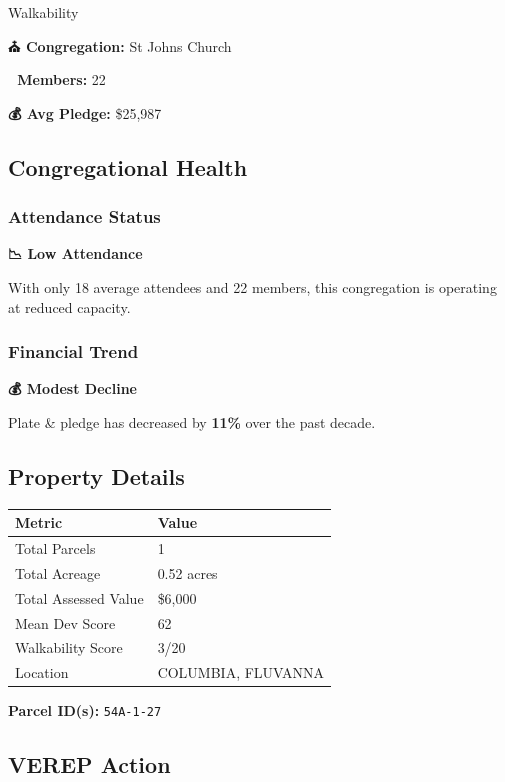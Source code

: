 \documentclass[
  letterpaper,
  DIV=11,
  numbers=noendperiod,
  oneside]{scrreprt}
\begin{document}
{Walkability}

\textbf{⛪ Congregation:} St Johns Church

\textbf{👥 Members:} 22

\textbf{💰 Avg Pledge:} \$25,987

\subsection{Congregational Health}

\subsubsection{Attendance Status}\label{attendance-status-2}

\textbf{📉 Low Attendance}

With only 18 average attendees and 22 members, this congregation is
operating at reduced capacity.

\subsubsection{Financial Trend}\label{financial-trend-2}

\textbf{💰 Modest Decline}

Plate \& pledge has decreased by \textbf{11\%} over the past decade.

\subsection{Property Details}

\begin{longtable}[]{@{}ll@{}}
\toprule\noalign{}
Metric & Value \\
\midrule\noalign{}
\endhead
\bottomrule\noalign{}
\endlastfoot
Total Parcels & 1 \\
Total Acreage & 0.52 acres \\
Total Assessed Value & \$6,000 \\
Mean Dev Score & 62 \\
Walkability Score & 3/20 \\
Location & COLUMBIA, FLUVANNA \\
\end{longtable}

\textbf{Parcel ID(s):} \texttt{54A-1-27}

\subsection{VEREP Action}
\end{document}
